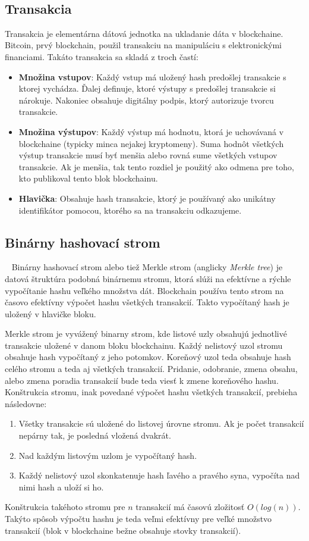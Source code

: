 ~\cite{zhengBlockchainOverview}


\subsection{Transakcia}\label{subsec:transaction}
Transakcia je elementárna dátová jednotka na ukladanie dáta v blockchaine. Bitcoin, prvý blockchain, použil transakciu na manipuláciu s elektronickými financiami. Takáto transakcia sa skladá z troch častí:
\begin{itemize}
	\item \textbf{Množina vstupov}: Každý vstup má uložený hash predošlej transakcie s ktorej vychádza. Ďalej definuje, ktoré výstupy s predošlej transakcie si nárokuje. Nakoniec obsahuje digitálny podpis, ktorý autorizuje tvorcu transakcie.
	\item \textbf{Množina výstupov}: Každý výstup má hodnotu, ktorá je uchovávaná v blockchaine (typicky minca nejakej kryptomeny). Suma hodnôt všetkých výstup transakcie musí byť menšia alebo rovná sume všetkých vstupov transakcie. Ak je menšia, tak tento rozdiel je použitý ako odmena pre toho, kto publikoval tento blok blockchainu.
	\item \textbf{Hlavička}: Obsahuje hash transakcie, ktorý je používaný ako unikátny identifikátor pomocou, ktorého sa na transakciu odkazujeme.
\end{itemize}


\subsection{Binárny hashovací strom}~\label{subsec:merkle-tree}
Binárny hashovací strom alebo tiež Merkle strom (anglicky \textit{Merkle tree}) je datová štruktúra podobná binárnemu stromu, ktorá slúži na efektívne a rýchle vypočítanie hashu veľkého množstva dát. Blockchain používa tento strom na časovo efektívny výpočet hashu všetkých transakcií. Takto vypočítaný hash je uložený v hlavičke bloku.

Merkle strom je vyvážený binarny strom, kde listové uzly obsahujú jednotlivé transakcie uložené v danom bloku blockchainu. Každý nelistový uzol stromu obsahuje hash vypočítaný z jeho potomkov. Koreňový uzol teda obsahuje hash celého stromu a teda aj všetkých transakcií. Pridanie, odobranie, zmena obsahu, alebo zmena poradia transakcií bude teda viesť k zmene koreňového hashu. Konštrukcia stromu, inak povedané výpočet hashu všetkých transakcií, prebieha následovne:
\begin{enumerate}
	\item Všetky transakcie sú uložené do listovej úrovne stromu. Ak je počet transakcií nepárny tak, je posledná vložená dvakrát.
	\item Nad každým listovým uzlom je vypočítaný hash.
	\item Každý nelistový uzol skonkatenuje hash ľavého a pravého syna, vypočíta nad nimi hash a uloží si ho. 
\end{enumerate}
Konštrukcia takéhoto stromu pre $n$ transakcií má časovú zložitosť $O(log(n))$. Takýto spôsob výpočtu hashu je teda veľmi efektívny pre veľké množstvo transakcií (blok v blockchaine bežne obsahuje stovky transakcií).~\cite{merkleTreeBosamia}

